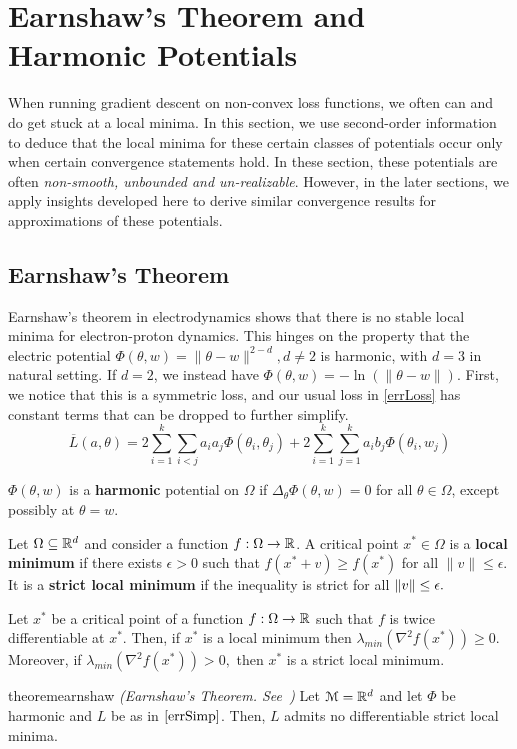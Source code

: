 \section{Earnshaw's Theorem and Harmonic Potentials} 
%
When running gradient descent on non-convex loss functions, we often
can and do get stuck at a local minima. In this section, we use
second-order information to deduce that the local
minima for these certain classes of potentials occur only when certain convergence statements hold. In these section, these potentials are often {\it non-smooth, unbounded and un-realizable}. However, in the later sections, we apply insights developed here to derive similar convergence results for approximations of these potentials.
%
\subsection{Earnshaw's Theorem}
%
Earnshaw's theorem in electrodynamics shows that there is no stable
local minima for electron-proton dynamics. This hinges on the property
that the electric potential
$\Phi(\theta,w) = \|\theta-w\|^{2-d}, d \neq 2$ is harmonic, with
$d = 3$ in natural setting. If $d = 2$, we instead have
$\Phi(\theta, w) = - \ln(\|\theta - w\|)$. First, we notice that this
is a symmetric loss, and our usual loss in \eqref{errLoss} has
constant terms that can be dropped to further simplify.
%
\begin{equation}\label{errSimp}
\overline{L}(a,\theta) =  2\sum_{i=1}^k\sum_{i < j} a_ia_j\Phi(\theta_i,\theta_j) + 2\sum_{i=1}^k\sum_{j=1}^ka_ib_j \Phi(\theta_i,w_j)
\end{equation} 
%
\begin{definition}
$\Phi(\theta,w)$ is a {\bf harmonic} potential on $\Omega$ if $\Delta_\theta \Phi(\theta,w) = 0$ for all $\theta \in \Omega$, except possibly at $\theta = w$.
\end{definition}

\begin{definition}
  Let $\Omega \subseteq {\mathbb{R}}^d$ and consider a function
  $f:\Omega \to {\mathbb{R}}$. A critical point $x^* \in \Omega$ is a {\bf local
    minimum} if there exists $\epsilon > 0$ such that
  $f(x^*+v) \geq f(x^*)$ for all $\|v\|\leq \epsilon$. It is a {\bf
    strict local minimum} if the inequality is strict for all
  $\left\lVert v \right\rVert \le \epsilon.$
\end{definition} 
%
\begin{fact}
  Let $x^*$ be a critical point of a function $f : \Omega \to {\mathbb{R}}$ such
  that $f$ is twice differentiable at $x^*.$ Then, if $x^*$ is a local
  minimum then $\lambda_{min}(\nabla^2 f(x^*)) \geq 0.$ Moreover, if
  $\lambda_{min}(\nabla^2 f(x^*)) > 0,$ then $x^*$ is a strict local minimum.
\end{fact}
%
\begin{restatable}{theorem}{earnshaw}
\emph{(Earnshaw's Theorem. See~\cite{arnold1985mathematical})}
\label{Earnshaw} 
Let $\mathcal{M} = {\mathbb{R}}^d$ and let $\Phi$ be harmonic and $L$
be as in $\eqref{errSimp}$. Then, $L$ admits no
differentiable strict local minima.
\end{restatable}
%


